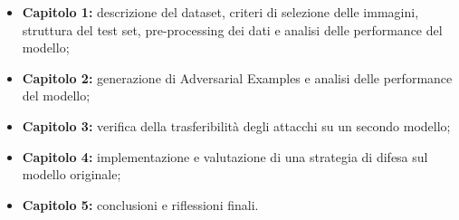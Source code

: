         \begin{itemize}
            \item \textbf{Capitolo 1:} descrizione del dataset, criteri di selezione delle immagini, struttura del test set, pre-processing dei dati e analisi delle performance del modello;
            
            \item \textbf{Capitolo 2:} generazione di Adversarial Examples e analisi delle performance del modello;
            
            \item \textbf{Capitolo 3:} verifica della trasferibilità degli attacchi su un secondo modello;
            
            \item \textbf{Capitolo 4:} implementazione e valutazione di una strategia di difesa sul modello originale;
            
            \item \textbf{Capitolo 5:} conclusioni e riflessioni finali.
        \end{itemize}